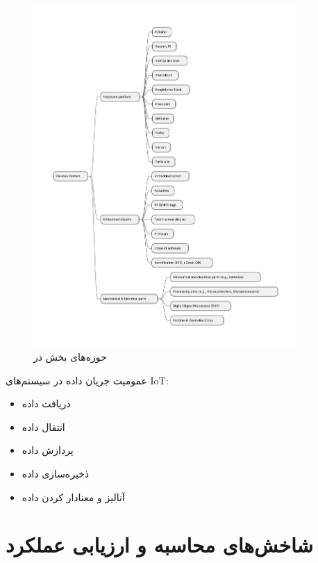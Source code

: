 \documentclass[a4paper]{article}
\begin{document}
\begin{figure}[H]
  \centering
  \includegraphics[width=0.9\textwidth]{./figures/IoT_devices_domains.pdf}
  \caption{حوزه‌های بخش  در }
  \label{fig:iotDevicesDomains}
\end{figure}

عمومیت جریان داده در سیستم‌های IoT:

\begin{itemize}
    \item دریافت داده
    \item انتقال داده
    \item پردازش داده
    \item ذخیره‌سازی داده
    \item آنالیز و معنادار کردن داده
\end{itemize}

\section{شاخش‌های محاسبه و ارزیابی عملکرد}
\end{document}
